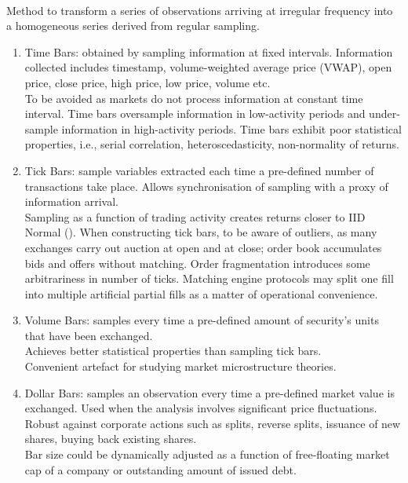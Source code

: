 \begin{remark} \\
Method to transform a series of observations arriving at irregular frequency into a homogeneous series derived from regular sampling.
\begin{enumerate}[label=\roman*.]
\setlength{\itemsep}{0pt}
\item Time Bars: obtained by sampling information at fixed intervals. Information collected includes timestamp, volume-weighted average price (VWAP), open price, close price, high price, low price, volume etc.\\
To be avoided as markets do not process information at constant time interval. Time bars oversample information in low-activity periods and under-sample information in high-activity periods. Time bars exhibit poor statistical properties, i.e., serial correlation, heteroscedasticity, non-normality of returns.
\item Tick Bars: sample variables extracted each time a pre-defined number of transactions take place. Allows synchronisation of sampling with a proxy of information arrival.\\
Sampling as a function of trading activity creates returns closer to IID Normal (\cite{Thierry_Helyette_2000}). When constructing tick bars, to be aware of outliers, as many exchanges carry out auction at open and at close; order book accumulates bids and offers without matching. Order fragmentation introduces some arbitrariness in number of ticks. Matching engine protocols may split one fill into multiple artificial partial fills as a matter of operational convenience.
\item Volume Bars: samples every time a pre-defined amount of security's units that have been exchanged.\\
Achieves better statistical properties than sampling tick bars.\\
Convenient artefact for studying market microstructure theories.
\item Dollar Bars: samples an observation every time a pre-defined market value is exchanged. Used when the analysis involves significant price fluctuations. Robust against corporate actions such as splits, reverse splits, issuance of new shares, buying back existing shares.\\
Bar size could be dynamically adjusted as a function of free-floating market cap of a company or outstanding amount of issued debt.
\end{enumerate}
\end{remark}

